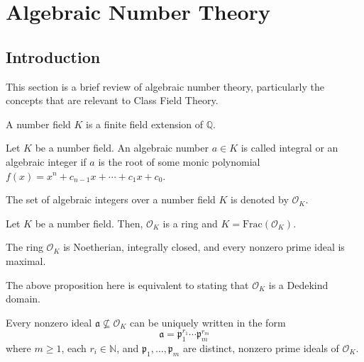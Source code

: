 \chapter{Algebraic Number Theory}

\section{Introduction}

This section is a brief review of algebraic number theory, particularly the concepts that are relevant to Class Field Theory.

\begin{definition}
A number field $K$ is a finite field extension of $\mathbb{Q}$.
\end{definition}

\begin{definition}
    Let $K$ be a number field. An algebraic number $a \in K$ is called integral or an algebraic integer if $a$ is the root of some monic polynomial $f(x) = x^n + c_{n-1}x + \cdots + c_1x + c_0$.
\end{definition}

The set of algebraic integers over a number field $K$ is denoted by $\mathcal{O}_K$.

\begin{proposition}
    Let $K$ be a number field. Then, $\mathcal{O}_K$ is a ring and $K = \textrm{Frac}(\mathcal{O}_K)$.
\end{proposition}

\begin{proposition}
    The ring $\mathcal{O}_K$ is Noetherian, integrally closed, and every nonzero prime ideal is maximal.
\end{proposition}


The above proposition here is equivalent to stating that $\mathcal{O}_K$ is a Dedekind domain.

\begin{theorem}
    Every nonzero ideal $\mathfrak{a} \not\subseteq \mathcal{O}_K$ can be uniquely written in the form
        \[\mathfrak{a} = \mathfrak{p}_1^{r_1}\cdots\mathfrak{p}_m^{r_m}\]
    where $m \geq 1$, each $r_i \in \mathbb{N}$, and  $\mathfrak{p}_1, \ldots, \mathfrak{p}_m$ are distinct, nonzero prime ideals of $\mathcal{O}_K$.
\end{theorem}